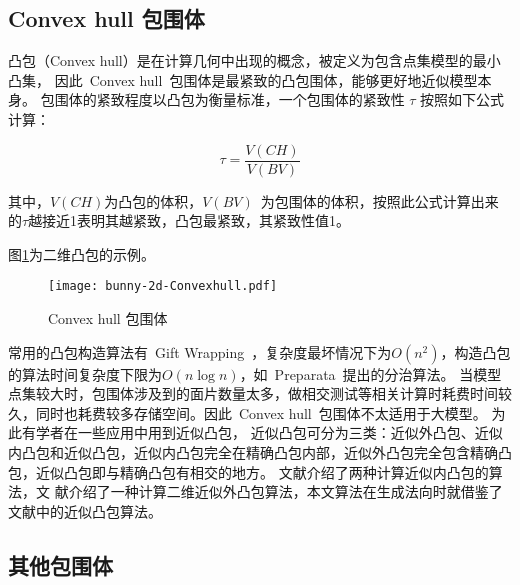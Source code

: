 \subsection{Convex hull 包围体}
\label{subsec:convexhull}

凸包（Convex hull）是在计算几何中出现的概念，被定义为包含点集模型的最小凸集\cite{dengcg}，
因此~Convex hull~包围体是最紧致的凸包围体，能够更好地近似模型本身。
包围体的紧致程度以凸包为衡量标准，一个包围体的紧致性 $\tau$ 按照如下公式计算：

\begin{equation}
\label{equa:judge:tightness}
\tau = \frac{V(CH)}{V(BV)}
\end{equation}

其中，$V(CH)$为凸包的体积，$V(BV)$~为包围体的体积，按照此公式计算出来的$\tau$越接近1表明其越紧致，凸包最紧致，其紧致性值1。

图\ref{fig:convexhull-bunny}为二维凸包的示例。

\begin{figure}[htbp] %
  \centering
  \texttt{[image: bunny-2d-Convexhull.pdf]}
  \caption{Convex hull 包围体}
  \label{fig:convexhull-bunny}
\end{figure}

常用的凸包构造算法有~Gift Wrapping~\cite{Chand1970An}，复杂度最坏情况下为$O(n^2)$，构造凸包的算法时间复杂度下限为$O(n\log n)$，如~Preparata~提出的分治算法\cite{Preparata1977}。
当模型点集较大时，包围体涉及到的面片数量太多，做相交测试等相关计算时耗费时间较久，同时也耗费较多存储空间。因此~Convex hull~包围体不太适用于大模型。
为此有学者在一些应用中用到近似凸包，
近似凸包可分为三类：近似外凸包、近似内凸包和近似凸包\cite{hossain2013constructing}，近似内凸包完全在精确凸包内部，近似外凸包完全包含精确凸包，近似凸包即与精确凸包有相交的地方。
文献介绍了两种计算近似内凸包的算法，文
献介绍了一种计算二维近似外凸包算法，本文算法在生成法向时就借鉴了文献中的近似凸包算法。

\subsection{其他包围体}

